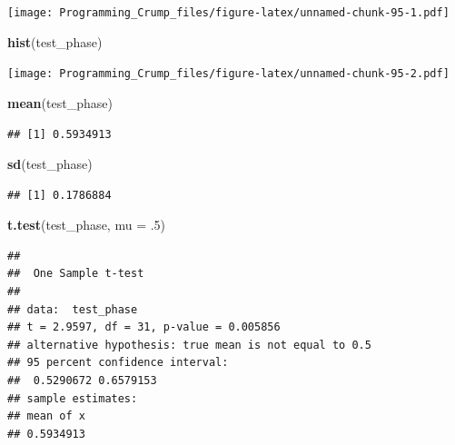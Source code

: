\documentclass[]{book}
\newenvironment{Shaded}{\begin{snugshade}}{\end{snugshade}}
\newcommand{\KeywordTok}[1]{\textcolor[rgb]{0.13,0.29,0.53}{\textbf{{#1}}}}
\newcommand{\DataTypeTok}[1]{\textcolor[rgb]{0.13,0.29,0.53}{{#1}}}
\newcommand{\DecValTok}[1]{\textcolor[rgb]{0.00,0.00,0.81}{{#1}}}
\newcommand{\StringTok}[1]{\textcolor[rgb]{0.31,0.60,0.02}{{#1}}}
\newcommand{\NormalTok}[1]{{#1}}
\theoremstyle{definition}
\theoremstyle{definition}
\theoremstyle{definition}
\theoremstyle{remark}
\begin{document}
\begin{Shaded}
\end{Shaded}

\texttt{[image: Programming\_Crump\_files/figure-latex/unnamed-chunk-95-1.pdf]}

\begin{Shaded}
\begin{Highlighting}[]
\KeywordTok{hist}\NormalTok{(test_phase)}
\end{Highlighting}
\end{Shaded}

\texttt{[image: Programming\_Crump\_files/figure-latex/unnamed-chunk-95-2.pdf]}

\begin{Shaded}
\begin{Highlighting}[]
\KeywordTok{mean}\NormalTok{(test_phase)}
\end{Highlighting}
\end{Shaded}

\begin{verbatim}
## [1] 0.5934913
\end{verbatim}

\begin{Shaded}
\begin{Highlighting}[]
\KeywordTok{sd}\NormalTok{(test_phase)}
\end{Highlighting}
\end{Shaded}

\begin{verbatim}
## [1] 0.1786884
\end{verbatim}

\begin{Shaded}
\begin{Highlighting}[]
\KeywordTok{t.test}\NormalTok{(test_phase, }\DataTypeTok{mu =} \NormalTok{.}\DecValTok{5}\NormalTok{)}
\end{Highlighting}
\end{Shaded}

\begin{verbatim}
## 
##  One Sample t-test
## 
## data:  test_phase
## t = 2.9597, df = 31, p-value = 0.005856
## alternative hypothesis: true mean is not equal to 0.5
## 95 percent confidence interval:
##  0.5290672 0.6579153
## sample estimates:
## mean of x 
## 0.5934913
\end{verbatim}
\end{document}
